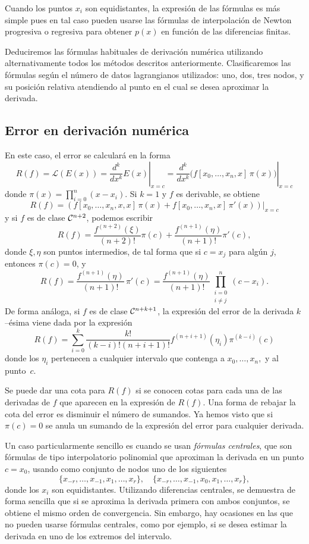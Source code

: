 Cuando los puntos $x_i$ son equidistantes, la expresi\'on de las f\'ormulas es
m\'as simple pues en tal caso pueden usarse las f\'ormulas de interpolaci\'on de Newton progresiva o regresiva para obtener $p(x)$ en funci\'on de las diferencias finitas.

\bigskip

Deduciremos las f\'ormulas habituales de derivaci\'on num\'erica utilizando alternativamente todos los m\'etodos descritos anteriormente. Clasificaremos las f\'ormulas seg\'un el n\'umero de datos lagrangianos utilizados: uno, dos, tres nodos, y su posici\'on relativa atendiendo al punto en el cual se desea aproximar la derivada.

\subsection*{Error en derivaci\'on num\'erica}

En este caso, el error se calcular\'a en la forma
$$
R(f) = \mathcal{L}(E(x))= \left.\frac{d^k}{dx^k}E(x)\right|_{x=c} =
    \left.\frac{d^k}{dx^k}\Big(f[x_0,\ldots,x_n,x]\, \pi(x)\Big)\right|_{x=c}
$$
donde $\displaystyle \pi(x) = \prod_{i=0}^n (x-x_i)$.
Si $k=1$ y $f$ es derivable, se obtiene
$$
  R(f) = \left.\left(f[x_0,\ldots,x_n,x,x]\,\pi(x) + f[x_0,\ldots,x_n,x]\,\pi'(x)\right)\right|_{x=c}
$$
y si $f$ es de clase ${\cal C}^{n+2}$, podemos escribir
$$
  R(f) = \frac{f^{(n+2)}(\xi)}{(n+2)!}\pi(c) + \frac{f^{(n+1)}(\eta)}{(n+1)!} \pi'(c),
$$
donde $\xi, \eta$ son puntos intermedios, de tal forma que si $c=x_j$ para alg\'un $j$, entonces $\pi(c)=0$, y
$$
  R(f) = \frac{f^{(n+1)}(\eta)}{(n+1)!}\,\pi'(c)
       = \frac{f^{(n+1)}(\eta)}{(n+1)!}\prod_{\substack{ i=0 \\ i \ne j}}^n
         (c-x_i).
$$
De forma an\'aloga, si $f$ es de clase ${\cal C}^{n+k+1}$, la expresi\'on del
error de la derivada $k$--\'esima viene dada por la expresi\'on
$$
  R(f) = \sum_{i=0}^k \frac{k!}{(k-i)!(n+i+1)!}f^{(n+i+1)}(\eta_i)\pi^{(k-i)}(c)
$$
donde los $\eta_i$ pertenecen a cualquier intervalo que contenga a
$x_0,\ldots,x_n,$ y al punto~$c$.

Se puede dar una cota para $R(f)$ si se conocen cotas para
cada una de las derivadas de $f$ que aparecen en la expresi\'on de $R(f)$. Una
forma de rebajar la cota del error es disminuir el n\'umero de sumandos. Ya hemos visto que si $\pi(c) = 0$ se anula un sumando de la expresi\'on del error para cualquier derivada. 

Un caso particularmente sencillo es cuando se usan {\it f\'ormulas centrales}, que son f\'ormulas
 de tipo interpolatorio polinomial que aproximan la derivada en un punto $c= x_0$, usando
como conjunto de nodos uno de los siguientes
$$
  \big\{x_{-r},\ldots,x_{-1},x_1,\ldots,x_r\big\},\quad
  \big\{x_{-r},\ldots,x_{-1},x_0,x_1,\ldots,x_r\big\},
$$
donde los $x_i$ son equidistantes. Utilizando diferencias centrales, se demuestra de forma sencilla 
que si se aproxima la derivada
primera con ambos conjuntos, se obtiene el mismo orden de convergencia. 
Sin embargo, hay ocasiones en las que no pueden usarse f\'ormulas
centrales, como por ejemplo, si se desea estimar la derivada en uno de los extremos del 
intervalo.

